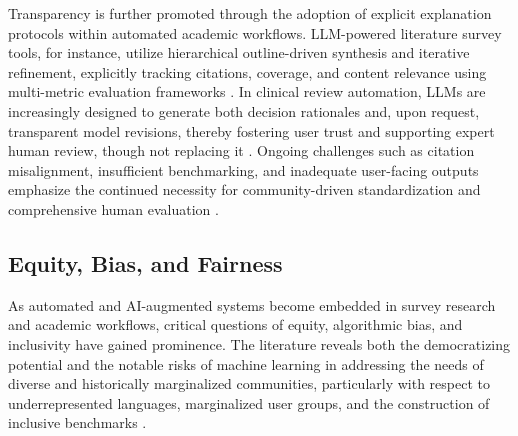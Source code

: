 Transparency is further promoted through the adoption of explicit explanation protocols within automated academic workflows. LLM-powered literature survey tools, for instance, utilize hierarchical outline-driven synthesis and iterative refinement, explicitly tracking citations, coverage, and content relevance using multi-metric evaluation frameworks \cite{ref62,ref80,ref82,ref102}. In clinical review automation, LLMs are increasingly designed to generate both decision rationales and, upon request, transparent model revisions, thereby fostering user trust and supporting expert human review, though not replacing it \cite{ref80,ref102,ref103}. Ongoing challenges such as citation misalignment, insufficient benchmarking, and inadequate user-facing outputs emphasize the continued necessity for community-driven standardization and comprehensive human evaluation \cite{ref39,ref62,ref64,ref80,ref83,ref106}.

\subsection{Equity, Bias, and Fairness}

As automated and AI-augmented systems become embedded in survey research and academic workflows, critical questions of equity, algorithmic bias, and inclusivity have gained prominence. The literature reveals both the democratizing potential and the notable risks of machine learning in addressing the needs of diverse and historically marginalized communities, particularly with respect to underrepresented languages, marginalized user groups, and the construction of inclusive benchmarks \cite{ref2}\cite{ref4}\cite{ref7}\cite{ref9}\cite{ref10}\cite{ref13}\cite{ref14}\cite{ref15}\cite{ref23}\cite{ref24}\cite{ref39}\cite{ref40}\cite{ref41}\cite{ref45}\cite{ref51}\cite{ref53}\cite{ref64}\cite{ref65}\cite{ref66}\cite{ref70}\cite{ref76}\cite{ref80}\cite{ref81}\cite{ref82}\cite{ref83}\cite{ref84}\cite{ref85}\cite{ref89}\cite{ref90}\cite{ref91}\cite{ref92}\cite{ref93}\cite{ref94}\cite{ref95}\cite{ref96}\cite{ref97}\cite{ref98}\cite{ref99}\cite{ref100}\cite{ref105}\cite{ref106}.

